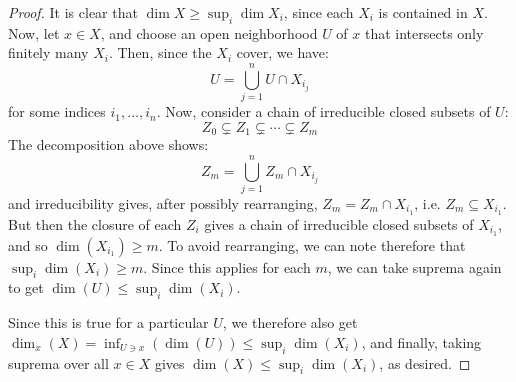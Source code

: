 \begin{proof}
	It is clear that $\dim X \geq \sup_i \dim X_i$, since each $X_i$ is contained in $X$. Now, let $x \in X$, and choose an open neighborhood $U$ of $x$ that intersects only finitely many $X_i$. Then, since the $X_i$ cover, we have:
	\[ U = \bigcup_{j=1}^n U \cap X_{i_j} \]
	for some indices $i_1,\ldots,i_n$. Now, consider a chain of irreducible closed subsets of $U$:
	\[ Z_0 \subsetneq Z_1 \subsetneq \cdots \subsetneq Z_m \]
	The decomposition above shows:
	\[ Z_m = \bigcup_{j=1}^n Z_m \cap X_{i_j} \]
	and irreducibility gives, after possibly rearranging, $Z_m = Z_m \cap X_{i_1}$, i.e. $Z_m \subseteq X_{i_1}$. But then the closure of each $Z_i$ gives a chain of irreducible closed subsets of $X_{i_1}$, and so $\dim(X_{i_1}) \geq m$. To avoid rearranging, we can note therefore that $\sup_i \dim(X_i) \geq m$. Since this applies for each $m$, we can take suprema again to get $\dim(U) \leq \sup_i \dim(X_i)$.
	
	Since this is true for a particular $U$, we therefore also get $\dim_x(X) = \inf_{U \ni x}(\dim(U)) \leq \sup_i\dim(X_i)$, and finally, taking suprema over all $x \in X$ gives $\dim(X) \leq \sup_i\dim(X_i)$, as desired.
\end{proof}
